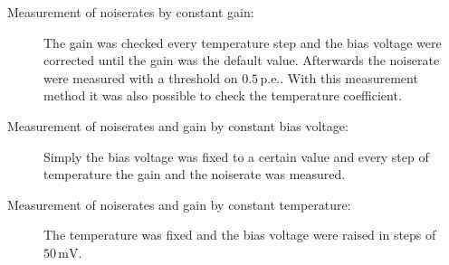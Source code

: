 \begin{description}
	\item[Measurement of noiserates by constant gain:] The gain was checked every temperature step and the bias voltage were corrected until the gain was the default value. Afterwards the noiserate were measured with a threshold on $0.5\,\mathrm{p.e.}$. With this measurement method it was also possible to check the temperature coefficient.
	\item[Measurement of noiserates and gain by constant bias voltage:] Simply the bias voltage was fixed to a certain value and every step of temperature the gain and the noiserate was measured.
	\item[Measurement of noiserates and gain by constant temperature:] The temperature was fixed and the bias voltage were raised in steps of $50\,\mathrm{mV}$. 
\end{description}

